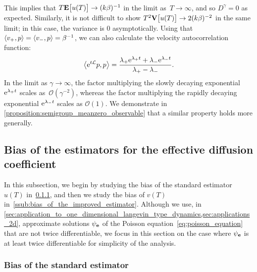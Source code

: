 \documentclass[11pt,a4paper]{article}
\begin{document}
\begin{example}
\begin{align*}
    \end{align*}
    This implies that
    \(
        T \mathbf{E} \bigl[ u(T) \bigr] \to (k \beta)^{-1}
    \)
    in the limit as~$T \to \infty$,
    and so $D^{\gamma} = 0$ as expected.
    Similarly, it is not difficult to show $T^2\mathbf{V} \bigl[ u(T) \bigr] \to 2 (k \beta)^{-2}$ in the same limit;
    in this case, the variance is 0 asymptotically.
    Using that $\ip{v_+}{p} = \ip{v_-}{p} = \beta^{-1}$,
    we can also calculate the velocity autocorrelation function:
    \begin{equation}
        \label{eq:velocity_autocorrelation_quadratic}
        \ip{\e^{t \mathcal L}p}{p} =
        \frac{\lambda_+ \e^{\lambda_+ t} + \lambda_- \e^{\lambda_- t}}{\lambda_+ - \lambda_-}.
    \end{equation}
    In the limit as $\gamma \to \infty$,
    the factor multiplying the slowly decaying exponential $\mathrm{e}^{\lambda_+ t}$ scales as~$\mathcal O(\gamma^{-2})$,
    whereas the factor multiplying the rapidly decaying exponential $\mathrm{e}^{\lambda_- t}$ scales as $\mathcal O(1)$.
    We demonstrate in \cref{proposition:semigroup_meanzero_observable} that a similar property holds more generally.
\end{example}

\subsection{Bias of the estimators for the effective diffusion coefficient}%
\label{sub:bias}

In this subsection,
we begin by studying the bias of the standard estimator $u(T)$ in~\cref{ssub:bias_of_the_standard_estimator},
and then we study the bias of $v(T)$ in~\cref{ssub:bias_of_the_improved_estimator}.
Although we use, in \cref{sec:application_to_one_dimensional_langevin_type_dynamics,sec:applications_2d},
approximate solutions $\psi_{\boldsymbol{\mathbf e}}$ of the Poisson equation~\eqref{eq:poisson_equation} that are not twice differentiable,
we focus in this section on the case where $\psi_{\boldsymbol{\mathbf e}}$ is at least twice differentiable for simplicity of the analysis.

\subsubsection{Bias of the standard estimator}%
\label{ssub:bias_of_the_standard_estimator}
\end{document}

